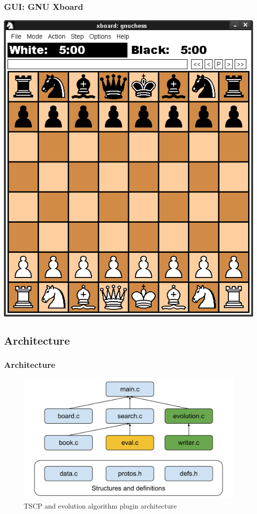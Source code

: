 \documentclass{beamer}
\begin{document}
\begin{frame}
\frametitle{GUI: GNU Xboard}
\begin{center}
\includegraphics[scale=0.3]{images/xboard_view.png}
\end{center}
\end{frame}

\begin{frame}
\subsection{Architecture}
\frametitle{Architecture}
\begin{center}
\begin{figure}
\includegraphics[scale=0.3]{images/Chess_AI_Architecture.png}
\caption{TSCP and evolution algorithm plugin architecture}
\end{figure}
\end{center}
\end{frame}
\end{document}
